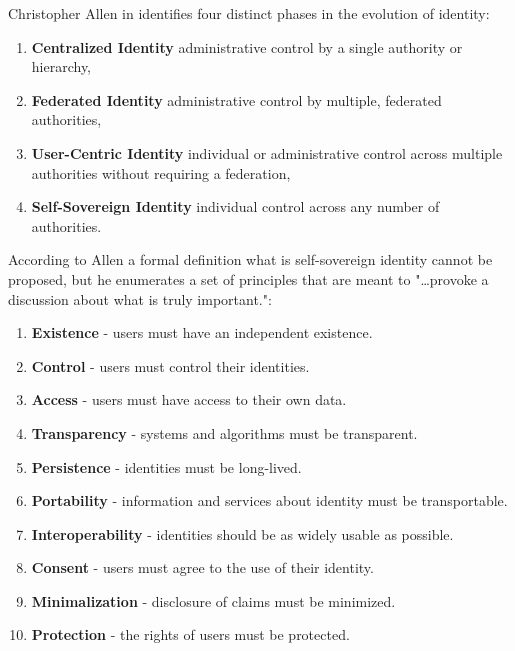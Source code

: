 Christopher Allen in \cite{ssi-allen} identifies four distinct phases in the evolution of identity:

\begin{enumerate}
	\itemsep0em
	\item \textbf{Centralized Identity} administrative control by a single authority or hierarchy,
	\item \textbf{Federated Identity} administrative control by multiple, federated authorities,
	\item \textbf{User-Centric Identity} individual or administrative control across multiple authorities without requiring a federation,
	\item \textbf{Self-Sovereign Identity} individual control across any number of authorities.
\end{enumerate}

According to Allen \cite{ssi-allen} a formal definition what is self-sovereign identity cannot be proposed, but he enumerates a set of principles that are meant to "\dots provoke a discussion about what is truly important.":

\begin{enumerate}
	\itemsep0em %
	\item \textbf{Existence} - users must have an independent existence.
	\item \textbf{Control} - users must control their identities.
	\item \textbf{Access} - users must have access to their own data.
	\item \textbf{Transparency} - systems and algorithms must be transparent. 
	\item \textbf{Persistence} - identities must be long-lived.
	\item \textbf{Portability} - information and services about identity must be transportable.
	\item \textbf{Interoperability} - identities should be as widely usable as possible.
	\item \textbf{Consent} - users must agree to the use of their identity.
	\item \textbf{Minimalization} - disclosure of claims must be minimized.
	\item \textbf{Protection} - the rights of users must be protected.
\end{enumerate}

